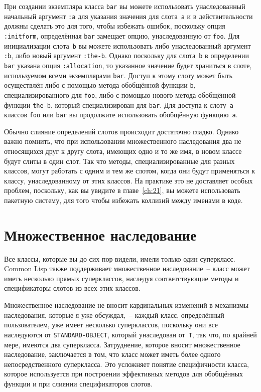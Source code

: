 При создании экземпляра класса \lstinline{bar} вы можете использовать унаследованный начальный
аргумент \lstinline{:a} для указания значения для слота~\lstinline{a} и в действительности должны
сделать это для того, чтобы избежать ошибок, поскольку опция \lstinline{:initform}, определённая
\lstinline{bar} замещает опцию, унаследованную от \lstinline{foo}. Для инициализации слота~\lstinline{b}
вы можете использовать либо унаследованный аргумент \lstinline{:b}, либо новый аргумент
\lstinline{:the-b}.  Однако поскольку для слота~\lstinline{b} в определении \lstinline{bar} указана
опция \lstinline{:allocation}, то указанное значение будет храниться в слоте, используемом
всеми экземплярами \lstinline{bar}. Доступ к этому слоту может быть осуществлён либо
с помощью метода обобщённой функции \lstinline{b}, специализированного для \lstinline{foo}, либо с
помощью нового метода обобщённой функции \lstinline{the-b}, который специализирован для
\lstinline{bar}.  Для доступа к слоту~\lstinline{a} классов \lstinline{foo} или \lstinline{bar} вы продолжите
использовать обобщённую функцию~\lstinline{a}.

Обычно слияние определений слотов происходит достаточно гладко.  Однако важно помнить,
что при использовании множественного наследования два не относящихся друг к другу слота,
имеющих одно и то же имя, в новом классе будут слиты в один слот.  Так что методы,
специализированные для разных классов, могут работать с одним и тем же слотом, когда они
будут применяться к классу, унаследованному от этих классов.  На практике это не
доставляет особых проблем, поскольку, как вы увидите в главе~\ref{ch:21}, вы можете
использовать пакетную систему, для того чтобы избежать коллизий между именами в коде.

\section{Множественное наследование}
\label{sec:17-multi-inheritance}

Все классы, которые вы до сих пор видели, имели только один суперкласс. Common Lisp также
поддерживает множественное наследование~-- класс может иметь несколько прямых
суперклассов, наследуя соответствующие методы и спецификаторы слотов из всех этих классов.

Множественное наследование не вносит кардинальных изменений в механизмы наследования,
которые я уже обсуждал,~-- каждый класс, определённый пользователем, уже имеет несколько
суперклассов, поскольку они все наследуются от \lstinline{STANDARD-OBJECT}, который унаследован
от~\lstinline{T}, так что, по крайней мере, имеются два суперкласса.  Затруднение, которое вносит
множественное наследование, заключается в том, что класс может иметь более одного
непосредственного суперкласса.  Это усложняет понятие специфичности класса, которое
используется при построении эффективных методов для обобщённых функции и при слиянии
спецификаторов слотов.

